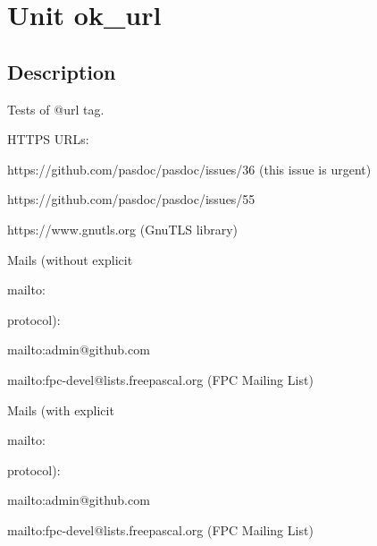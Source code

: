 \documentclass{report}
\begin{document}
\newlength{\tmplength}
\chapter{Unit ok{\_}url}
\section{Description}
Tests of @url tag.

HTTPS URLs:

https://github.com/pasdoc/pasdoc/issues/36 (this issue is urgent)

https://github.com/pasdoc/pasdoc/issues/55

https://www.gnutls.org (GnuTLS library)

Mails (without explicit \begin{ttfamily}mailto:\end{ttfamily} protocol):

mailto:admin@github.com

mailto:fpc-devel@lists.freepascal.org (FPC Mailing List)

Mails (with explicit \begin{ttfamily}mailto:\end{ttfamily} protocol):

mailto:admin@github.com

mailto:fpc-devel@lists.freepascal.org (FPC Mailing List)
\end{document}
